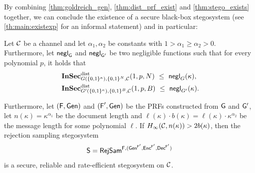  


By combining \autoref{thm:goldreich_gen}, 
\autoref{thm:dist_prf_exist} and \autoref{thm:stego_exists}
together, we can conclude the existence of a secure black-box
stegosystem (see \autoref{th:main:existexp}
for an informal statement) and in particular:


\begin{theorem}
  \label{thm:stego_negl}
  Let $\mathcal{C}$ be a channel and let $\alpha_1, \alpha_2$ be
  constants with $1>\alpha_{1}\geq \alpha_{2}>0$. Furthermore, let
  $\operatorname{\mathsf{negl}}_{\mathsf{G}}$ and $\operatorname{\mathsf{negl}}_{\mathsf{G'}}$ be two negligible functions such that for
  every polynomial $p$, it holds that
  \begin{align*}
    &\InSec^{\dist}_{G(\{0,1\}^{\kappa}),\{0,1\}^{N},\chan}(1,p,N) \ \leq \
      \negl_{G}(\kappa),\\
    &\InSec^{\dist}_{G'(\{0,1\}^{\kappa}),\{0,1\}^{B},\chan}(1,p,B) \ \leq \ \negl_{G'}(\kappa).
  \end{align*}
  
  Furthermore, let $(\operatorname{\mathsf{F}},\operatorname{\mathsf{Gen}})$ and $(\operatorname{\mathsf{F}}',\operatorname{\mathsf{Gen}})$ be the \acp{PRF}
  constructed from $\mathsf{G}$ and $\mathsf{G'}$, let
  $n(\kappa)=\kappa^{\alpha_{1}}$ be the document length and
  $\ell(\kappa)\cdot b(\kappa)=\ell(\kappa)\cdot \kappa^{\alpha_{2}}$ be the
  message length for some polynomial $\ell$. If
  $H_{\infty}(\mathcal{C},n(\kappa))> 2b(\kappa)$, then the rejection sampling
  stegosystem
  \begin{align*}
    \operatorname{\mathsf{S}}=\operatorname{\mathsf{RejSam}}^{\operatorname{\mathsf{F}},(\operatorname{\mathsf{Gen}}^{\operatorname{\mathsf{F}}'},\operatorname{\mathsf{Enc}}^{\operatorname{\mathsf{F}}'},\operatorname{\mathsf{Dec}}^{\operatorname{\mathsf{F}}'})}
  \end{align*}
  is a secure,
  reliable and rate-efficient stegosystem on $\mathcal{C}$. 
\end{theorem}

